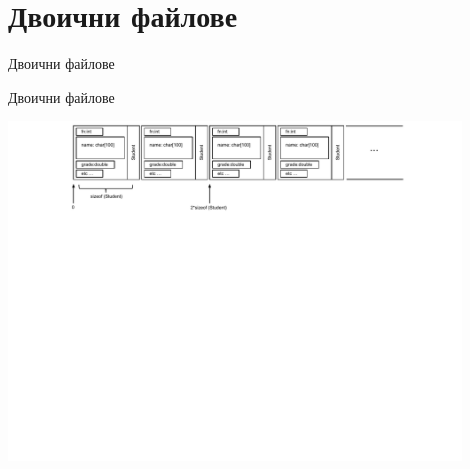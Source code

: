 \documentclass{beamer}
\begin{document}
\section {Двоични файлове}

\begin{frame}
\centerline{Двоични файлове}
\end{frame}


\begin{frame}
\centerline{Двоични файлове}
\vspace{75px}
\includegraphics[width=12cm]{images/binfile}
\end{frame}
\end{document}
